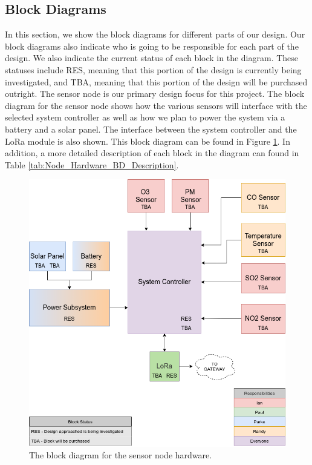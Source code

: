 \subsection{Block Diagrams}
In this section, we show the block diagrams for different parts of our design. Our block diagrams also indicate who is going to be responsible for each part of the design. We also indicate the current status of each block in the diagram. These statuses include RES, meaning that this portion of the design is currently being investigated, and TBA, meaning that this portion of the design will be purchased outright. The sensor node is our primary design focus for this project. The block diagram for the sensor node shows how the various sensors will interface with the selected system controller as well as how we plan to power the system via a battery and a solar panel. The interface between the system controller and the LoRa module is also shown. This block diagram can be found in Figure \ref{fig:hwNodeBD}. In addition, a more detailed description of each block in the diagram can found in Table \ref{tab:Node_Hardware_BD_Description}.

\begin{figure}[H]
    \centering
    \includegraphics[width=5.3in]{"./figures/hwNodeBD.png"} 
    \caption{The block diagram for the sensor node hardware.}
    \label{fig:hwNodeBD}
\end{figure}


